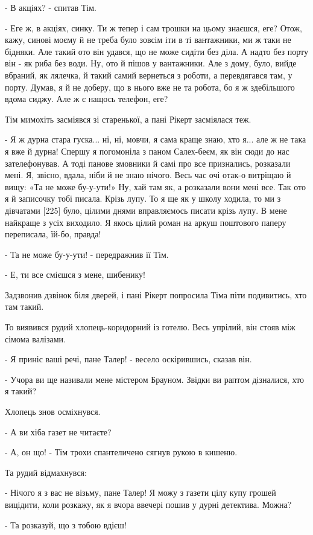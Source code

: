 - В акціях? - спитав Тім.

- Еге ж, в акціях, синку. Ти ж тепер і сам трошки на цьому знаєшся, еге? Отож, кажу, синові моєму й не треба було зовсім іти в ті вантажники, ми ж таки не бідняки. Але такий ото він удався, що не може сидіти без діла. А надто без порту він - як риба без води. Ну, ото й пішов у вантажники. Але з дому, було, вийде вбраний, як лялечка, й такий самий вернеться з роботи, а перевдягався там, у порту. Думав, я й не доберу, що в нього вже не та робота, бо я ж здебільшого вдома сиджу. Але ж є нащось телефон, еге?

Тім мимохіть засміявся зі старенької, а пані Рікерт засміялася теж.

- Я ж дурна стара гуска... ні, ні, мовчи, я сама краще знаю, хто я... але ж не така я вже й дурна! Спершу я погомоніла з паном Салех-беєм, як він сюди до нас зателефонував. А тоді панове змовники й самі про все признались, розказали мені. Я, звісно, вдала, ніби й не знаю нічого. Весь час очі отак-о витріщаю й вищу: «Та не може бу-у-ути!» Ну, хай там як, а розказали вони мені все. Так ото я й записочку тобі писала. Крізь лупу. То я ще як у школу ходила, то ми з дівчатами [225] було, цілими днями вправляємось писати крізь лупу. В мене найкраще з усіх виходило. Я якось цілий роман на аркуш поштового паперу переписала, їй-бо, правда!

- Та не може бу-у-ути! - передражнив її Тім.

- Е, ти все смієшся з мене, шибенику!

Задзвонив дзвінок біля дверей, і пані Рікерт попросила Тіма піти подивитись, хто там такий.

То виявився рудий хлопець-коридорний із готелю. Весь упрілий, він стояв між сімома валізами.

- Я приніс ваші речі, пане Талер! - весело оскірившись, сказав він.

- Учора ви ще називали мене містером Брауном. Звідки ви раптом дізналися, хто я такий?

Хлопець знов осміхнувся.

- А ви хіба газет не читаєте?

- А, он що! - Тім трохи спантеличено сягнув рукою в кишеню.

Та рудий відмахнувся:

- Нічого я з вас не візьму, пане Талер! Я можу з газети цілу купу грошей вицідити, коли розкажу, як я вчора ввечері пошив у дурні детектива. Можна?

- Та розказуй, що з тобою вдієш!

